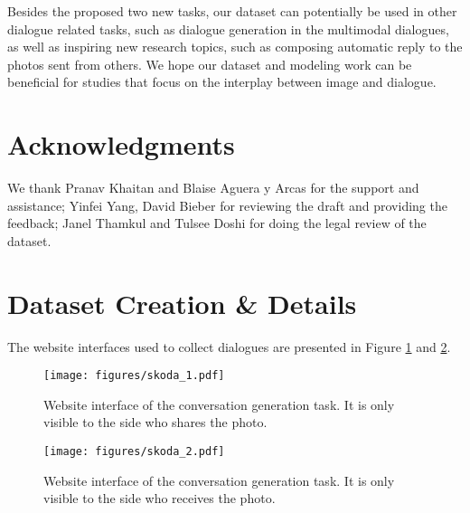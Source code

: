 \documentclass[11pt,a4paper]{article}
\begin{document}
Besides the proposed two new tasks, our dataset can potentially be used in other dialogue related tasks, such as dialogue generation in the multimodal dialogues, as well as inspiring new research topics, such as composing automatic reply to the photos sent from others. 
We hope our dataset and modeling work can be beneficial for studies that focus on the interplay between image and dialogue.

\small
\section*{Acknowledgments}

We thank Pranav Khaitan and Blaise Aguera y Arcas for the support and assistance; Yinfei Yang,  David Bieber for reviewing the draft and providing the feedback; Janel Thamkul and Tulsee Doshi for doing the legal review of the dataset.

\normalsize




\appendix
\section{Dataset Creation \& Details}\label{sec:dataset_app}
The website interfaces used to collect dialogues are presented in Figure \ref{fig:skoda_1} and \ref{fig:skoda_2}.
\begin{figure}[h]
  \centering
  \texttt{[image: figures/skoda\_1.pdf]}
\caption{Website interface of the conversation generation task. It is only visible to the side who shares the photo.}
  \label{fig:skoda_1}
  \setlength{\belowcaptionskip}{-10pt}
\end{figure}
\begin{figure}[h]
  \centering
  \texttt{[image: figures/skoda\_2.pdf]}
\caption{Website interface of the conversation generation task. It is only visible to the side who receives the photo.}
  \label{fig:skoda_2}
  \setlength{\belowcaptionskip}{-10pt}
\end{figure}
\end{document}
